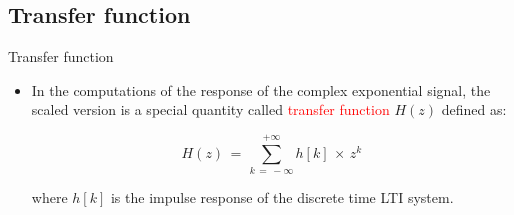 \subsection{Transfer function}
\begin{frame}[t,allowframebreaks]{Transfer function}

\begin{itemize}

\item In the computations of the response of the complex exponential signal, the scaled version is a special quantity called \textcolor{red}{transfer function} $H(z)$ defined as:

\begin{equation}
H(z) \, = \, \displaystyle\sum_{k \, = \, - \infty}^{+ \infty} h[k] \, \times \, z^k
\end{equation}

where $h[k]$ is the impulse response of the discrete time LTI system.

\end{itemize}

\end{frame}

